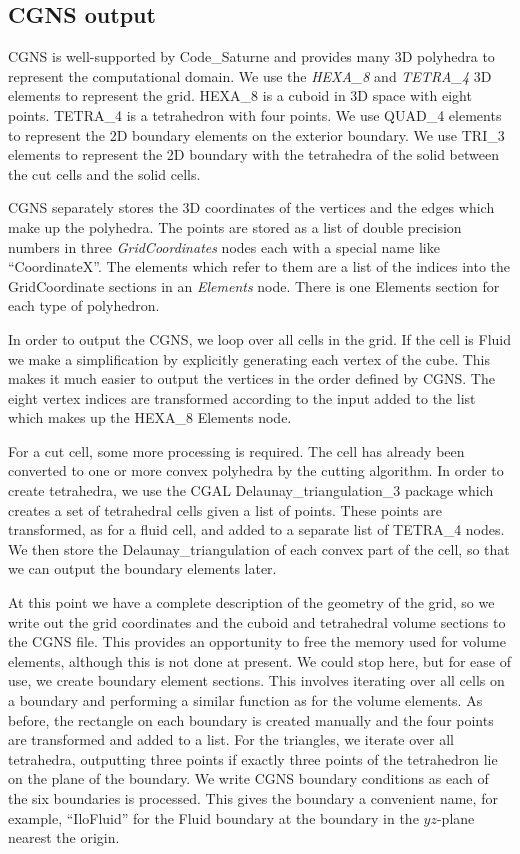 \documentclass[a4paper,10pt]{article}
\begin{document}
\subsection{CGNS output}

CGNS is well-supported by Code\_Saturne and provides many 3D polyhedra to
represent the computational domain. We use the \textit{HEXA\_8} and
\textit{TETRA\_4} 3D elements to represent the grid. HEXA\_8 is a cuboid in 3D
space with eight points. TETRA\_4 is a tetrahedron with four points. We use
QUAD\_4 elements to represent the 2D boundary elements on the exterior
boundary. We use TRI\_3 elements to represent the 2D boundary with the
tetrahedra of the solid between the cut cells and the solid cells.

CGNS separately stores the 3D coordinates of the vertices and the edges which
make up the polyhedra. The points are stored as a list of double precision
numbers in three \textit{GridCoordinates} nodes each with a special name like
``CoordinateX''. The elements which refer to them are a list of the indices
into the GridCoordinate sections in an \textit{Elements} node. There is one
Elements section for each type of polyhedron.

In order to output the CGNS, we loop over all cells in the grid. If the cell is
Fluid we make a simplification by explicitly generating each vertex of the
cube. This makes it much easier to output the vertices in the order defined by
CGNS. The eight vertex indices are transformed according to the input added to
the list which makes up the HEXA\_8 Elements node.

For a cut cell, some more processing is required. The cell has already been
converted to one or more convex polyhedra by the cutting algorithm. In order to
create tetrahedra, we use the CGAL Delaunay\_triangulation\_3 package which
creates a set of tetrahedral cells given a list of points. These points are
transformed, as for a fluid cell, and added to a separate list of TETRA\_4
nodes. We then store the Delaunay\_triangulation of each convex part of the
cell, so that we can output the boundary elements later.

At this point we have a complete description of the geometry of the grid, so we
write out the grid coordinates and the cuboid and tetrahedral volume sections to
the CGNS file. This provides an opportunity to free the memory used for volume
elements, although this is not done at present. We could stop here, but for ease
of use, we create boundary element sections. This involves iterating over all
cells on a boundary and performing a similar function as for the volume
elements. As before, the rectangle on each boundary is created manually and the
four points are transformed and added to a list. For the triangles, we iterate
over all tetrahedra, outputting three points if exactly three points of the
tetrahedron lie on the plane of the boundary. We write CGNS boundary conditions
as each of the six boundaries is processed. This gives the boundary a
convenient name, for example, ``IloFluid'' for the Fluid boundary at the
boundary in the $yz$-plane nearest the origin.
\end{document}
